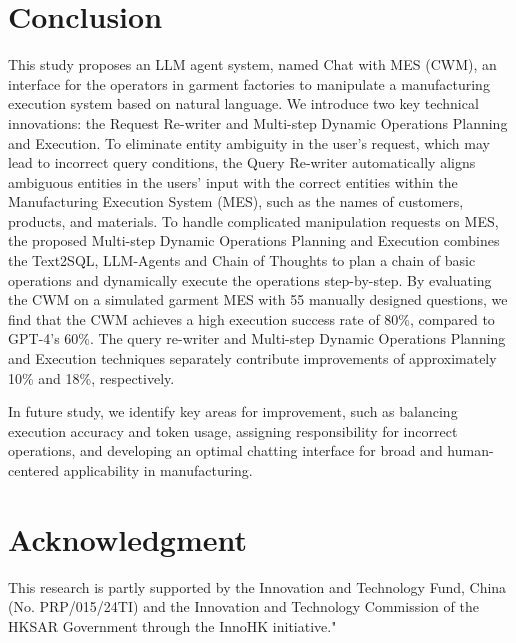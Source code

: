 \documentclass[preprint,12pt]{elsarticle}
\begin{document}



\section{Conclusion}
\label{sec:conclusion}
This study proposes an LLM agent system, named Chat with MES (CWM), an interface for the operators in garment factories to manipulate a manufacturing execution system based on natural language.
We introduce two key technical innovations: the Request Re-writer and Multi-step Dynamic Operations Planning and Execution.
To eliminate entity ambiguity in the user's request, which may lead to incorrect query conditions, the Query Re-writer automatically aligns ambiguous entities in the users' input with the correct entities within the Manufacturing Execution System (MES), such as the names of customers, products, and materials.
To handle complicated manipulation requests on MES, the proposed Multi-step Dynamic Operations Planning and Execution combines the Text2SQL, LLM-Agents and Chain of Thoughts to plan a chain of basic operations and dynamically execute the operations step-by-step.
By evaluating the CWM on a simulated garment MES with 55 manually designed questions, we find that the CWM achieves a high execution success rate of 80\%, compared to GPT-4's 60\%. 
The query re-writer and Multi-step Dynamic Operations Planning and Execution techniques separately contribute improvements of approximately 10\% and 18\%, respectively.

In future study, we identify key areas for improvement, such as balancing execution accuracy and token usage, assigning responsibility for incorrect operations, and developing an optimal chatting interface for broad and human-centered applicability in manufacturing.

\section{Acknowledgment}
This research is partly supported by the Innovation and Technology Fund, China (No. PRP/015/24TI) and the Innovation and Technology Commission of the HKSAR Government through the InnoHK initiative."

\end{document}
